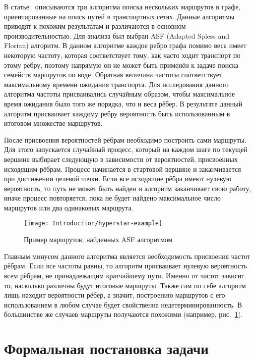 \label{subsec:dijkstra-hyperstar}

В статье~\cite{mafast} описываются три алгоритма поиска нескольких
маршрутов в графе, ориентированные на поиск путей в транспортных
сетях. Данные алгоритмы приводят к похожим результатам и различаются в
основном производительностью. Для анализа был выбран ASF (Adapted
Spiess and Florian) алгоритм. В данном алгоритме каждое ребро графа
помимо веса имеет некоторую частоту, которая соответствует тому, как
часто ходит транспорт по этому ребру, поэтому напрямую он не может
быть применён к задаче поиска семейств маршрутов по воде. Обратная
величина частоты соответствует максимальному времени ожидания
транспорта. Для исследования данного алгоритма частоты присваивались
случайным образом, чтобы максимальное время ожидания было того же
порядка, что и веса рёбер. В результате данный алгоритм присваивает
каждому ребру вероятность быть использованным в итоговом множестве
маршрутов.

После присвоения вероятностей рёбрам необходимо построить сами
маршруты. Для этого запускается случайный процесс, который на каждом
шаге по текущей вершине выбирает следующую в зависимости от
вероятностей, присвоенных исходящим рёбрам. Процесс начинается в
стартовой вершине и заканчивается при достижении целевой точки. Если
все исходящие рёбра имеют нулевую вероятность, то путь не может быть
найден и алгоритм заканчивает свою работу, иначе процесс повторяется,
пока не будет найдено максимальное число маршрутов или два одинаковых
маршрута.

\begin{figure}[t]
    \texttt{[image: Introduction/hyperstar-example]}
    \caption{Пример маршрутов, найденных ASF алгоритмом}
    \label{fig:asf}
\end{figure}

Главным минусом данного алгоритма является необходимость присвоения
частот рёбрам. Если все частоты равны, то алгоритм присваивает нулевую
вероятность всем рёбрам, не принадлежащим кратчайшему пути. Именно от
частот зависит то, насколько различны будут итоговые маршруты. Также
сам по себе алгоритм лишь находит вероятности рёбер, а значит,
построению маршрутов с его использованием в любом случае будет
свойственна недетерминированность. В большинстве же случаев маршруты
получаются похожими (например, рис.~\ref{fig:asf}).

\FloatBarrier

\section{Формальная постановка задачи}


